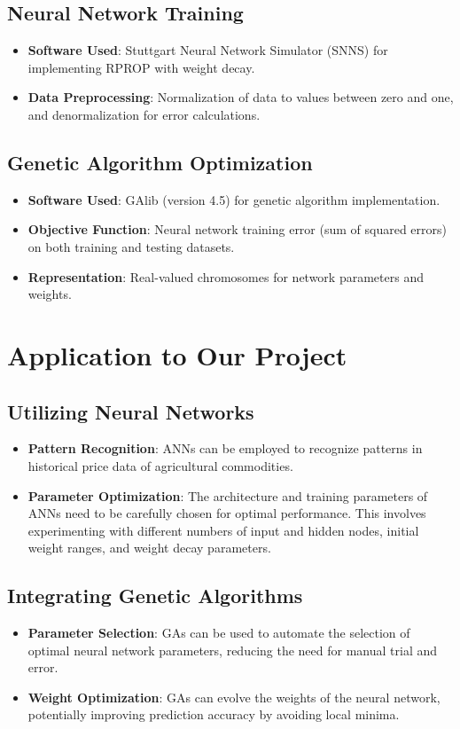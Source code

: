 \documentclass[12pt]{article}
\begin{document}
\subsection{Neural Network Training}
\begin{itemize}
    \item \textbf{Software Used}: Stuttgart Neural Network Simulator (SNNS) for implementing RPROP with weight decay.
    \item \textbf{Data Preprocessing}: Normalization of data to values between zero and one, and denormalization for error calculations.
\end{itemize}

\subsection{Genetic Algorithm Optimization}
\begin{itemize}
    \item \textbf{Software Used}: GAlib (version 4.5) for genetic algorithm implementation.
    \item \textbf{Objective Function}: Neural network training error (sum of squared errors) on both training and testing datasets.
    \item \textbf{Representation}: Real-valued chromosomes for network parameters and weights.
\end{itemize}

\section{Application to Our Project}

\subsection{Utilizing Neural Networks}
\begin{itemize}
    \item \textbf{Pattern Recognition}: ANNs can be employed to recognize patterns in historical price data of agricultural commodities.
    \item \textbf{Parameter Optimization}: The architecture and training parameters of ANNs need to be carefully chosen for optimal performance. This involves experimenting with different numbers of input and hidden nodes, initial weight ranges, and weight decay parameters.
\end{itemize}

\subsection{Integrating Genetic Algorithms}
\begin{itemize}
    \item \textbf{Parameter Selection}: GAs can be used to automate the selection of optimal neural network parameters, reducing the need for manual trial and error.
    \item \textbf{Weight Optimization}: GAs can evolve the weights of the neural network, potentially improving prediction accuracy by avoiding local minima.
\end{itemize}
\end{document}
